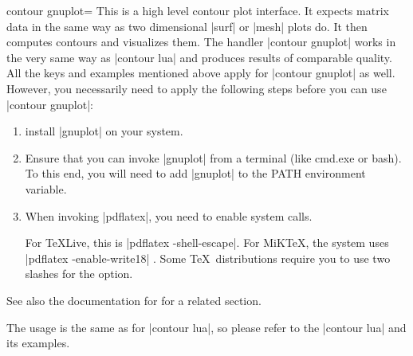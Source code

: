 {{\begin{plottype}[/pgfplots]{
    contour gnuplot=\textcolor{black}{}%
}
    This is a high level contour plot interface. It expects matrix data in the
    same way as two dimensional |surf| or |mesh| plots do. It then computes
    contours and visualizes them. The handler |contour gnuplot| works in the very same way as |contour lua| and produces results of comparable quality. All the keys and examples mentioned above apply for |contour gnuplot| as well. However, you necessarily need to apply the following steps before you can use |contour gnuplot|:
\begin{enumerate}
	\item install |gnuplot| on your system.
	\item Ensure that you can invoke |gnuplot| from a terminal (like cmd.exe or bash). To this end, you will need to add |gnuplot| to the PATH environment variable.
	\item When invoking |pdflatex|, you need to enable system calls.

        For \TeX{}Live, this is |pdflatex -shell-escape|. For MiK\TeX{}, the system uses |pdflatex -enable-write18| . Some \TeX\ distributions require you to use two slashes for the option.
\end{enumerate}
	See also the documentation for  for a related section.



	The usage is the same as for |contour lua|, so please refer to the |contour lua| and its examples.

\pgfplotsexpensiveexample
\begin{codeexample}[]
\end{codeexample}

\pgfplotsexpensiveexample
\begin{codeexample}[]
\end{codeexample}
\end{plottype}

}}
